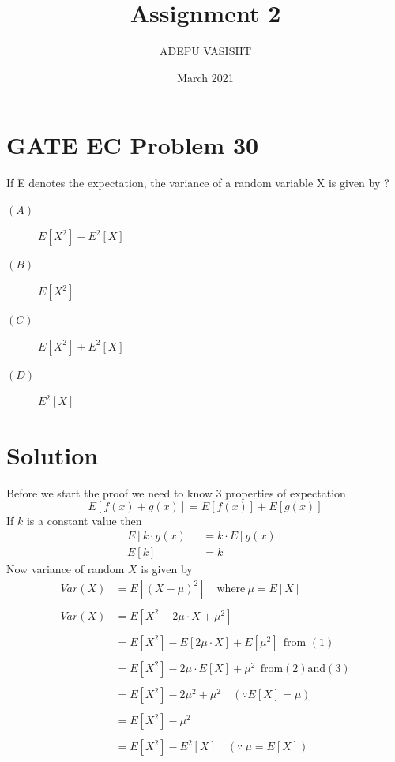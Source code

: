 \documentclass[journal,12pt,twocolumn]{IEEEtran}
\title{Assignment 2}
\author{ADEPU VASISHT}
\date{March 2021}
\providecommand{\brak}[1]{\ensuremath{\left(#1\right)}}
\begin{document}
\maketitle

\section*{GATE EC Problem 30}
If E denotes the expectation, the variance of a random variable X is given by ?

\begin{description}
\item[$\brak{A}$]$E[X^2]-E^2[X]$ 
\item[$\brak{B}$]$E[X^2]$
\item[$\brak{C}$]$E[X^2]+E^2[X]$ 
\item[$\brak{D}$]$E^2[X]$
\end{description}

\section*{Solution}

Before we start the proof we need to know 3 properties of expectation
\begin{equation}
E[f\brak{x}+g\brak{x}] = E[f\brak{x}]+E[g\brak{x}]
\end{equation}
If $k$ is a constant value then 
\begin{align}
E[k\cdot g\brak{x}] &= k\cdot E[g\brak{x}]\\
E[k]&=k
\end{align}
Now variance of random $X$ is given by 
\begin{align}
\nonumber \nonumber Var\brak{X} &= E[\brak{X-\mu}^2] \quad \text{where} \: \mu =E[X]\\
\nonumber \\
\nonumber Var\brak{X}&= E[X^2-2\mu\cdot X + \mu^2]\\
\nonumber\\
\nonumber &= E[X^2]-E[2\mu\cdot X] + E[\mu^2] \:\: \text{from } \brak{1}\\
\nonumber\\
\nonumber &=E[X^2]-2\mu\cdot E[X] + \mu^2 \:\: \text{from} \brak{2} \text{and} \brak{3}\\
\nonumber \\
\nonumber &=E[X^2]-2\mu^2+\mu^2 \quad \brak{\because E[X]=\mu}\\
\nonumber \\
\nonumber &= E[X^2]-\mu^2\\
\nonumber \\
\nonumber &= E[X^2]-E^2[X] \quad \brak{\because \: \mu = E[X]}
\end{align}
\end{document}
